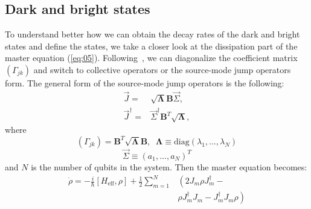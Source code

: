 \documentclass[lettersize,journal]{IEEEtran}
\begin{document}
\subsection{Dark and bright states}

To understand better how we can obtain the decay rates of the dark and bright states and define the states, we take a closer look at the dissipation part of the master equation (\ref{eq:05}).
Following~\cite{gross1982superradiance, carmichael_quantum_2000, clemens_collective_2003}, we can diagonalize the coefficient matrix $(\Gamma_{jk})$ and switch to collective operators or the source-mode jump operators form.
The general form of the source-mode jump operators is the following:
\begin{align}\label{eq:07}
    \vec{J} =& \sqrt{\mathbf{\Lambda}} \mathbf{B} \vec{\Sigma},\\
    \vec{J}^\dag =& \vec{\Sigma}^\dag \mathbf{B}^T \sqrt{\mathbf{\Lambda}},
\end{align}
where 
\begin{equation} \label{eq:08}
    \left( \Gamma_{jk} \right) = \mathbf{B}^T \sqrt{\mathbf{\Lambda}} \mathbf{B}, \;\; \mathbf{\Lambda} \equiv \mathrm{diag}(\lambda_1, \ldots, \lambda_N)
\end{equation}
\begin{equation} \label{eq:09}
    \vec{\Sigma} \equiv \left( a_1, \ldots, a_N \right)^T
\end{equation}
and $N$ is the number of qubits in the system.
Then the master equation becomes:
\begin{equation} \label{eq:10}
    \begin{aligned}
        \dot{\rho} = -\frac{i}{\hbar} \left[H_\mathrm{eff}, \rho\right] + \frac{1}{2} \sum_{m=1}^N &\left( 2 J_m \rho J_m^\dag - \right.\\
        &\left.\rho J_m^\dag J_m - J_m^\dag J_m \rho \right)
    \end{aligned}
\end{equation}
\end{document}
